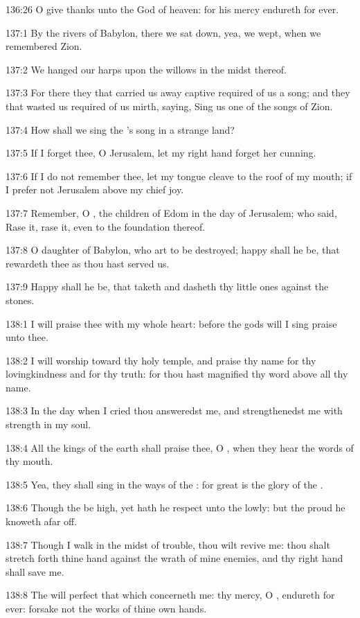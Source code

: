 136:26 O give thanks unto the God of heaven: for his mercy endureth
for ever.



137:1 By the rivers of Babylon, there we sat down, yea, we wept, when
we remembered Zion.

137:2 We hanged our harps upon the willows in the midst thereof.

137:3 For there they that carried us away captive required of us a
song; and they that wasted us required of us mirth, saying, Sing us
one of the songs of Zion.

137:4 How shall we sing the \LORD's song in a strange land?

137:5 If I forget thee, O Jerusalem, let my right hand forget her
cunning.

137:6 If I do not remember thee, let my tongue cleave to the roof of
my mouth; if I prefer not Jerusalem above my chief joy.

137:7 Remember, O \LORD, the children of Edom in the day of Jerusalem;
who said, Rase it, rase it, even to the foundation thereof.

137:8 O daughter of Babylon, who art to be destroyed; happy shall he
be, that rewardeth thee as thou hast served us.

137:9 Happy shall he be, that taketh and dasheth thy little ones
against the stones.



138:1 I will praise thee with my whole heart: before the gods will I
sing praise unto thee.

138:2 I will worship toward thy holy temple, and praise thy name for
thy lovingkindness and for thy truth: for thou hast magnified thy word
above all thy name.

138:3 In the day when I cried thou answeredst me, and strengthenedst
me with strength in my soul.

138:4 All the kings of the earth shall praise thee, O \LORD, when they
hear the words of thy mouth.

138:5 Yea, they shall sing in the ways of the \LORD: for great is the
glory of the \LORD.

138:6 Though the \LORD be high, yet hath he respect unto the lowly: but
the proud he knoweth afar off.

138:7 Though I walk in the midst of trouble, thou wilt revive me: thou
shalt stretch forth thine hand against the wrath of mine enemies, and
thy right hand shall save me.

138:8 The \LORD will perfect that which concerneth me: thy mercy, O
\LORD, endureth for ever: forsake not the works of thine own hands.



